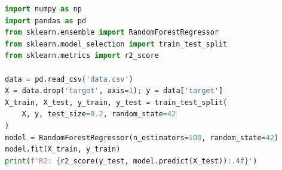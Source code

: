 
\begin{lstlisting}[language=Python]
import numpy as np
import pandas as pd
from sklearn.ensemble import RandomForestRegressor
from sklearn.model_selection import train_test_split
from sklearn.metrics import r2_score

data = pd.read_csv('data.csv')
X = data.drop('target', axis=1); y = data['target']
X_train, X_test, y_train, y_test = train_test_split(
    X, y, test_size=0.2, random_state=42
)
model = RandomForestRegressor(n_estimators=100, random_state=42)
model.fit(X_train, y_train)
print(f'R2: {r2_score(y_test, model.predict(X_test)):.4f}')
\end{lstlisting}
